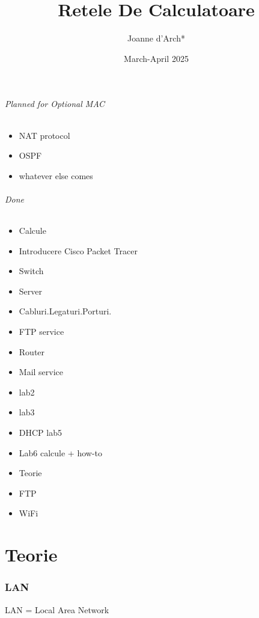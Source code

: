 \documentclass{article}
\title{Retele De Calculatoare}
\author{Joanne d'Arch*}
\date{March-April 2025}
\begin{document}
\maketitle



\paragraph{Planned for Optional MAC}
\begin{itemize}
    \item NAT protocol
    \item OSPF 
    \item whatever else comes
\end{itemize}

\paragraph{Done}

\begin{itemize}
    \item Calcule
    \item Introducere Cisco Packet Tracer
    \item Switch
    \item Server
    \item Cabluri.Legaturi.Porturi.
    \item FTP service
    \item Router
    \item Mail service
    \item lab2
    \item lab3
    \item DHCP lab5
    \item Lab6 calcule + how-to
    \item Teorie
    \item FTP
    \item WiFi
\end{itemize}

\newpage




\tableofcontents
\newpage

\part{Teorie}
\section{LAN}
LAN = Local Area Network
\end{document}
